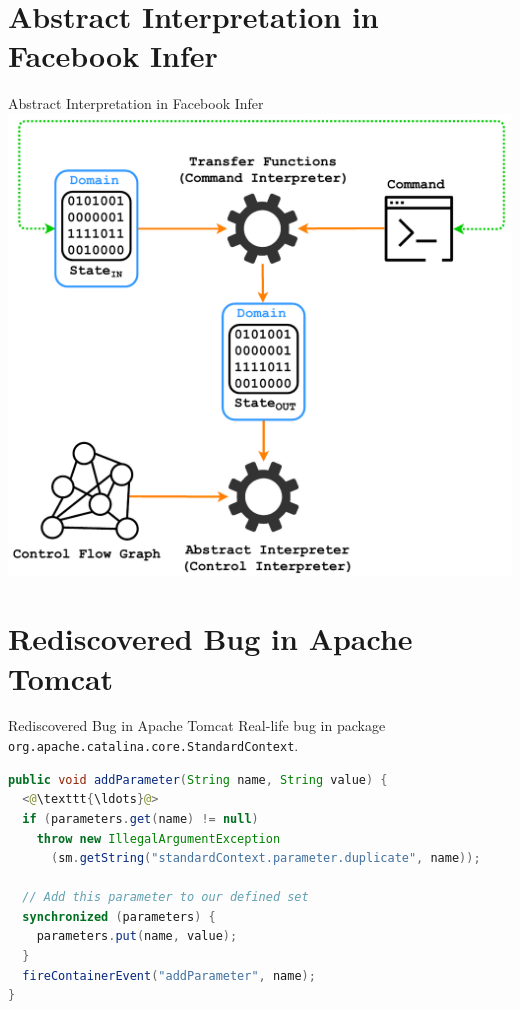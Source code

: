 \documentclass[10pt, xcolor=pdflatex, hyperref={unicode}, aspectratio=169]{beamer}
\begin{document}
\section{Abstract Interpretation in Facebook Infer}
\begin{frame}{Abstract Interpretation in Facebook Infer}
    \centering
    \includegraphics[width=.58 \linewidth]{infer-analysis.pdf}
\end{frame}


\section{Rediscovered Bug in Apache Tomcat}
\begin{frame}[fragile]{Rediscovered Bug in Apache Tomcat}
    \alert{Real-life bug} in package \texttt{org.apache.catalina.core.StandardContext}.

    \medskip

\begin{lstlisting}[language=java]
public void addParameter(String name, String value) {
  <@\texttt{\ldots}@>
  if (parameters.get(name) != null)
    throw new IllegalArgumentException
      (sm.getString("standardContext.parameter.duplicate", name));

  // Add this parameter to our defined set
  synchronized (parameters) {
    parameters.put(name, value);
  }
  fireContainerEvent("addParameter", name);
}
\end{lstlisting}
\end{frame}


\end{document}
